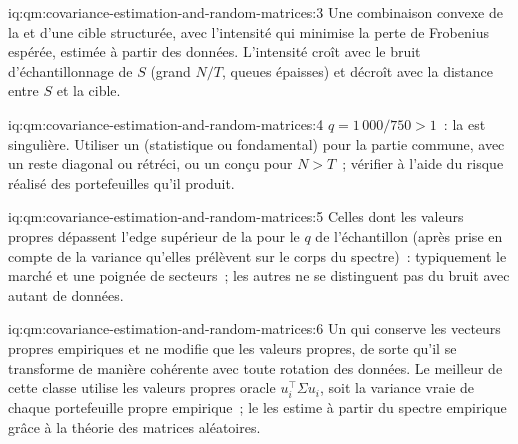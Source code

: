 \begin{solution}{iq:qm:covariance-estimation-and-random-matrices:3}
Une combinaison convexe de la  et d'une cible structurée, avec l'intensité qui minimise la perte de Frobenius espérée, estimée à partir des données. L'intensité croît avec le
bruit d'échantillonnage de $S$ (grand $N/T$, queues épaisses) et décroît avec la distance entre $S$ et la cible.
\end{solution}

\begin{solution}{iq:qm:covariance-estimation-and-random-matrices:4}
$q = 1\,000/750 > 1$~: la  est singulière. Utiliser un  (statistique ou fondamental) pour la partie commune, avec un reste diagonal ou rétréci, ou un 
conçu pour $N > T$~; vérifier à l'aide du risque réalisé des portefeuilles qu'il produit.
\end{solution}

\begin{solution}{iq:qm:covariance-estimation-and-random-matrices:5}
Celles dont les valeurs propres dépassent l'edge supérieur de la  pour le $q$ de l'échantillon (après prise en compte de la variance qu'elles prélèvent sur le corps du spectre)~: typiquement le marché et une poignée de
secteurs~; les autres ne se distinguent pas du bruit avec autant de données.
\end{solution}

\begin{solution}{iq:qm:covariance-estimation-and-random-matrices:6}
Un  qui conserve les vecteurs propres empiriques et ne modifie que les valeurs propres, de sorte qu'il se transforme de manière cohérente avec toute rotation des données. Le meilleur de cette classe utilise les valeurs propres oracle
$u_i^\top\Sigma u_i$, soit la variance vraie de chaque portefeuille propre empirique~; le  les estime à partir du spectre empirique grâce à la théorie des matrices aléatoires.
\end{solution}
